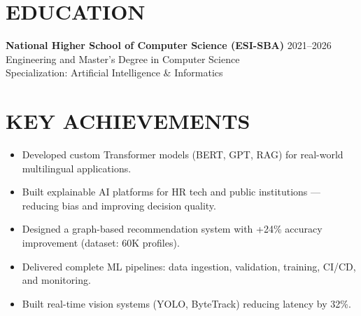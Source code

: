 \documentclass[a4paper,12pt]{article}
\begin{document}
\section{EDUCATION}
\textbf{National Higher School of Computer Science (ESI-SBA)} \hfill 2021--2026 \\
Engineering and Master’s Degree in Computer Science \\
Specialization: Artificial Intelligence \& Informatics

\section{KEY ACHIEVEMENTS}
\begin{itemize}
    \item Developed custom Transformer models (BERT, GPT, RAG) for real-world multilingual applications.
    \item Built explainable AI platforms for HR tech and public institutions — reducing bias and improving decision quality.
    \item Designed a graph-based recommendation system with +24\% accuracy improvement (dataset: 60K profiles).
    \item Delivered complete ML pipelines: data ingestion, validation, training, CI/CD, and monitoring.
    \item Built real-time vision systems (YOLO, ByteTrack) reducing latency by 32\%.
\end{itemize}

\newpage
\end{document}
